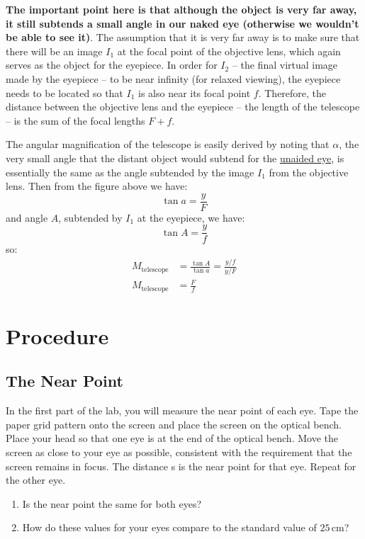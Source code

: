 \textbf{The important point here is that although the object is very far away, it still subtends a small angle in our naked eye (otherwise we wouldn't be able to see it)}. The assumption that it is very far away is to make sure that there will be an image $I_1$ at the focal point of the objective lens, which again serves as the object for the eyepiece. In order for $I_2$ -- the final virtual image made by the eyepiece -- to be near infinity (for relaxed viewing), the eyepiece needs to be located so that $I_1$ is also near its focal point $f$. Therefore, the distance between the objective lens and the eyepiece -- the length of the telescope -- is the sum of the focal lengths $F+f$.\myskip

The angular magnification of the telescope is easily derived by noting that $\alpha$, the very small angle that the distant object would subtend for the \underline{unaided eye}, is essentially the same as the angle subtended by the image $I_1$ from the objective lens. Then from the figure above we have:
\begin{equation}
  \tan a=\frac{y}{F}
\end{equation}
and angle $A$, subtended by $I_1$ at the eyepiece, we have:
\begin{equation}
  \tan A =\frac{y}{f}
\end{equation}
so:
\begin{align}
  M_{\mathrm{telescope}}&=\frac{\tan A}{\tan a}=\frac{y/f}{y/F}\\
  M_{\mathrm{telescope}}&=\frac{F}{f}
\end{align}


\section{Procedure}

\subsection{The Near Point}
In the first part of the lab, you will measure the near point of each eye. Tape the paper grid pattern onto the screen and place the screen on the optical bench. Place your head so that one eye is at the end of the  optical bench. Move the screen as close to your eye as possible, consistent with the requirement that the screen remains in focus. The distance s is the near point for that eye. Repeat for the other eye.
\begin{enumerate}
\item Is the near point the same for both eyes?
\item How do these values for your eyes compare to the standard value of $25\, \textrm{cm}$?
\end{enumerate}

